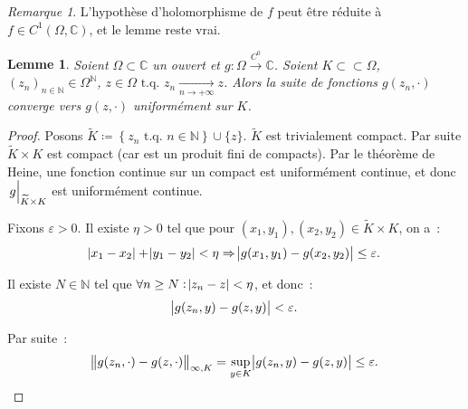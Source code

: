\documentclass{report}
\newtheorem{lem}[thm]{Lemme}
\theoremstyle{definition}
\theoremstyle{remark}
\newtheorem*{rmq}{Remarque}
\numberwithin{equation}{section}
\newcommand{\C}{\mathbb C}
\newcommand{\N}{\mathbb N}
\newcommand{\tq}{\text{ t.q. }}
\newcommand{\restr}[2]{\left.#1\vphantom{\big|}\right|_{#2}}
\newcommand{\toC}[1]{\xrightarrow{C^{#1}}}
\newcommand{\tocont}{\toC 0}
\newcommand{\pinfty}{{+\infty}}
\newcommand{\subscpct}{\subset\subset}
\begin{document}
			\begin{rmq} L'hypothèse d'holomorphisme de $f$ peut être réduite à $f \in C^1(\Omega, \C)$, et le lemme reste vrai.
			\end{rmq}

			\begin{lem}\label{lem:pré-Cauchy-2} Soient $\Omega \subset \C$ un ouvert et $g : \Omega \tocont \C$. Soient $K \subscpct \Omega$, $(z_n)_{n \in \N} \in \Omega^\N$,
			$z \in \Omega \tq z_n \xrightarrow[n \to \pinfty]{} z$. Alors la suite de fonctions $g(z_n, \cdot)$ converge vers $g(z, \cdot)$ uniformément
			sur $K$.
			\end{lem}

			\begin{proof} Posons $\widetilde K \coloneqq \left\{z_n \tq n \in \N\right\} \cup \{z\}$. $\widetilde K$ est trivialement compact. Par suite
			$\widetilde K \times K$ est compact (car est un produit fini de compacts). Par le théorème de Heine, une fonction continue sur un compact est
			uniformément continue, et donc $\restr g{\widetilde K \times K}$ est uniformément continue.

			Fixons $\varepsilon > 0$. Il existe $\eta > 0$ tel que pour $(x_1, y_1), (x_2, y_2) \in \widetilde K \times K$, on a~:
			\begin{equation}
				\abs {x_1 - x_2} + \abs {y_1 - y_2} < \eta \Rightarrow \abs {g(x_1, y_1) - g(x_2, y_2)} \leq \varepsilon.
			\end{equation}

			Il existe $N \in \N$ tel que $\forall n \geq N : \abs {z_n - z} < \eta$, et donc~:
			\begin{equation}
				\abs {g(z_n, y) - g(z, y)} < \varepsilon.
			\end{equation}

			Par suite~:
			\begin{equation}
				\norm {g(z_n, \cdot) - g(z, \cdot)}_{\infty, K} = \sup_{y \in K}\abs {g(z_n, y) - g(z, y)} \leq \varepsilon.
			\end{equation}
			\end{proof}
\end{document}
